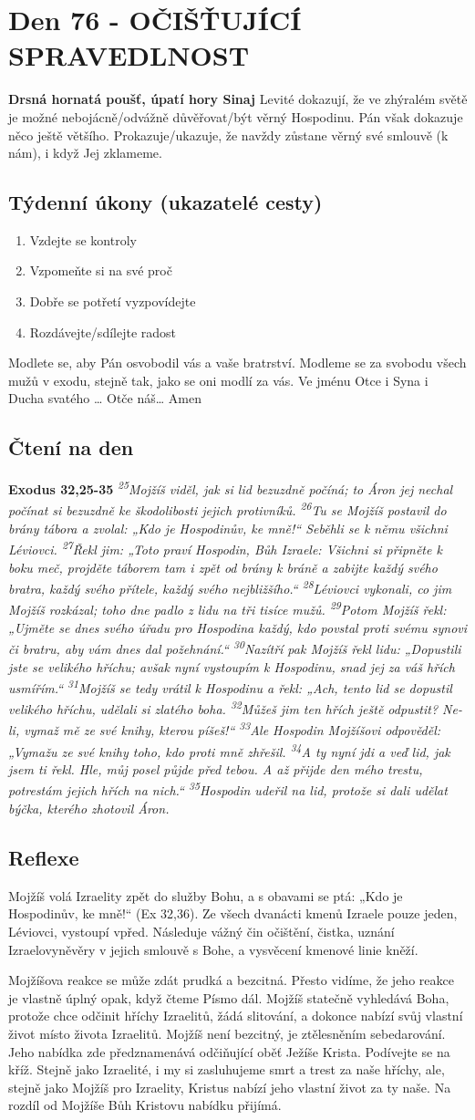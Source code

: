 \documentclass[11pt]{article}
\newcommand{\zacatekJedenactyTyden}{
\textbf{Drsná hornatá poušť, úpatí hory Sinaj} \newline 
Levité dokazují, že ve zhýralém světě je možné nebojácně/odvážně důvěřovat/být věrný Hospodinu. Pán však dokazuje něco ještě většího. Prokazuje/ukazuje, že navždy zůstane věrný své smlouvě (k nám), i když Jej zklameme.

\subsection*{Týdenní úkony (ukazatelé cesty)}
\begin{enumerate}
  \item Vzdejte se kontroly
  \item Vzpomeňte si na své proč
  \item Dobře se potřetí vyzpovídejte
  \item Rozdávejte/sdílejte radost
\end{enumerate}
Modlete se, aby Pán osvobodil vás a vaše bratrství. \newline
Modleme se za svobodu všech mužů v exodu, stejně tak, jako se oni modlí za vás.\newline
Ve jménu Otce i Syna i Ducha svatého …  Otče náš… Amen
}
\begin{document}
\newpage
\section{Den 76 - OČIŠŤUJÍCÍ SPRAVEDLNOST}
\zacatekJedenactyTyden
\subsection*{Čtení na den}
\textbf{Exodus 32,25-35}
\newline
\textit{
\textsuperscript{25}Mojžíš viděl, jak si lid bezuzdně počíná; to Áron jej nechal počínat si bezuzdně ke škodolibosti jejich protivníků.
\textsuperscript{26}Tu se Mojžíš postavil do brány tábora a zvolal: „Kdo je Hospodinův, ke mně!“ Seběhli se k němu všichni Léviovci.
\textsuperscript{27}Řekl jim: „Toto praví Hospodin, Bůh Izraele: Všichni si připněte k boku meč, projděte táborem tam i zpět od brány k bráně a zabijte každý svého bratra, každý svého přítele, každý svého nejbližšího.“
\textsuperscript{28}Léviovci vykonali, co jim Mojžíš rozkázal; toho dne padlo z lidu na tři tisíce mužů.
\textsuperscript{29}Potom Mojžíš řekl: „Ujměte se dnes svého úřadu pro Hospodina každý, kdo povstal proti svému synovi či bratru, aby vám dnes dal požehnání.“
\textsuperscript{30}Nazítří pak Mojžíš řekl lidu: „Dopustili jste se velikého hříchu; avšak nyní vystoupím k Hospodinu, snad jej za váš hřích usmířím.“
\textsuperscript{31}Mojžíš se tedy vrátil k Hospodinu a řekl: „Ach, tento lid se dopustil velikého hříchu, udělali si zlatého boha.
\textsuperscript{32}Můžeš jim ten hřích ještě odpustit? Ne-li, vymaž mě ze své knihy, kterou píšeš!“
\textsuperscript{33}Ale Hospodin Mojžíšovi odpověděl: „Vymažu ze své knihy toho, kdo proti mně zhřešil.
\textsuperscript{34}A ty nyní jdi a veď lid, jak jsem ti řekl. Hle, můj posel půjde před tebou. A až přijde den mého trestu, potrestám jejich hřích na nich.“
\textsuperscript{35}Hospodin udeřil na lid, protože si dali udělat býčka, kterého zhotovil Áron.
}

\subsection*{Reflexe}
Mojžíš volá Izraelity zpět do služby Bohu, a s obavami se ptá: „Kdo je Hospodinův, ke mně!“ (Ex 32,36). Ze všech
dvanácti kmenů Izraele pouze jeden, Léviovci, vystoupí vpřed. Následuje vážný čin očištění, čistka, uznání
Izraelovyněvěry v jejich smlouvě s Bohe, a vysvěcení kmenové linie kněží.

Mojžíšova reakce se může zdát prudká a bezcitná. Přesto vidíme, že jeho reakce je vlastně úplný opak, když čteme
Písmo dál. Mojžíš statečně vyhledává Boha, protože chce odčinit hříchy Izraelitů, žádá slitování, a dokonce nabízí svůj
vlastní život místo života Izraelitů. Mojžíš není bezcitný, je ztělesněním sebedarování. Jeho nabídka zde
předznamenává odčiňující oběť Ježíše Krista. Podívejte se na kříž. Stejně jako Izraelité, i my si zasluhujeme smrt a
trest za naše hříchy, ale, stejně jako Mojžíš pro Izraelity, Kristus nabízí jeho vlastní život za ty naše. Na rozdíl
od Mojžíše Bůh Kristovu nabídku přijímá.
\end{document}
